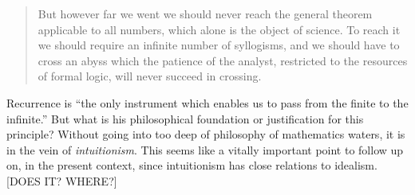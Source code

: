 \begin{quote}
    But however far we went we should never reach the general theorem applicable to all numbers, which alone is the object of science.  To reach it we should require an infinite number of syllogisms, and we should have to cross an abyss which the patience of the analyst, restricted to the resources of formal logic, will never succeed in crossing.  \citep[p. 10-11]{Poincare1952}
\end{quote}

Recurrence is ``the only instrument which enables us to pass from the finite to the infinite.''  \citep[p. 11]{Poincare1952}  But what is his  philosophical foundation or justification for this principle?  Without going into too deep of philosophy of mathematics waters, it is in the vein of \emph{intuitionism}.  This seems like a vitally important point to follow up on, in the present context, since intuitionism has close relations to idealism.  [DOES IT?  WHERE?]

